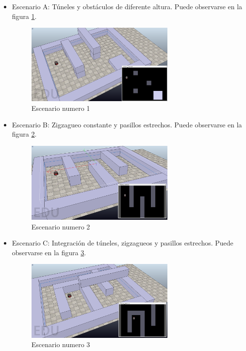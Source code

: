 \begin{itemize}
	\item Escenario A: Túneles y obstáculos de diferente altura. Puede observarse en la figura \ref{fig:escenario1}.	
	
	
\begin{figure}[h]
		\centering
        \includegraphics[width=0.7\textwidth]{images/escenario1}
        \caption{Escenario numero 1}
        \label{fig:escenario1}
\end{figure} 
	
	\item Escenario B: Zigzagueo constante y pasillos estrechos. Puede observarse en la figura \ref{fig:escenario2}.
	
		
\begin{figure}[h]
		\centering
        \includegraphics[width=0.7\textwidth]{images/escenario2.png}
        \caption{Escenario numero 2}
        \label{fig:escenario2}
\end{figure} 
	
	\item Escenario C: Integración de túneles, zigzagueos y pasillos estrechos. Puede observarse en la figura \ref{fig:escenario3}.

	
\begin{figure}[h]
		\centering
        \includegraphics[width=0.7\textwidth]{images/escenario3.png}
        \caption{Escenario numero 3}
        \label{fig:escenario3}
\end{figure} 

\end{itemize}




